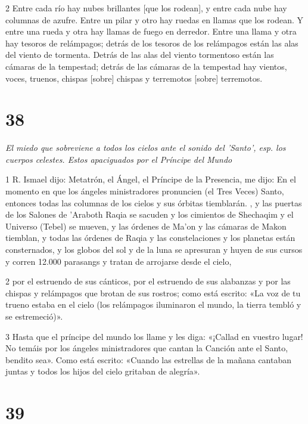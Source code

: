 \par 2 Entre cada río hay nubes brillantes [que los rodean], y entre cada nube hay columnas de azufre. Entre un pilar y otro hay ruedas en llamas que los rodean. Y entre una rueda y otra hay llamas de fuego en derredor. Entre una llama y otra hay tesoros de relámpagos; detrás de los tesoros de los relámpagos están las alas del viento de tormenta. Detrás de las alas del viento tormentoso están las cámaras de la tempestad; detrás de las cámaras de la tempestad hay vientos, voces, truenos, chispas [sobre] chispas y terremotos [sobre] terremotos.


\chapter{38}

\par \textit{El miedo que sobreviene a todos los cielos ante el sonido del 'Santo', esp. los cuerpos celestes. Estos apaciguados por el Príncipe del Mundo}

\par 1 R. Ismael dijo: Metatrón, el Ángel, el Príncipe de la Presencia, me dijo: En el momento en que los ángeles ministradores pronuncien (el Tres Veces) Santo, entonces todas las columnas de los cielos y sus órbitas tiemblarán. , y las puertas de los Salones de 'Araboth Raqia se sacuden y los cimientos de Shechaqim y el Universo (Tebel) se mueven, y las órdenes de Ma'on y las cámaras de Makon tiemblan, y todas las órdenes de Raqia y las constelaciones y los planetas están consternados, y los globos del sol y de la luna se apresuran y huyen de sus cursos y corren 12.000 parasangs y tratan de arrojarse desde el cielo,

\par 2 por el estruendo de sus cánticos, por el estruendo de sus alabanzas y por las chispas y relámpagos que brotan de sus rostros; como está escrito: «La voz de tu trueno estaba en el cielo (los relámpagos iluminaron el mundo, la tierra tembló y se estremeció)».

\par 3 Hasta que el príncipe del mundo los llame y les diga: «¡Callad en vuestro lugar! No temáis por los ángeles ministradores que cantan la Canción ante el Santo, bendito sea». Como está escrito: «Cuando las estrellas de la mañana cantaban juntas y todos los hijos del cielo gritaban de alegría».



\chapter{39}


